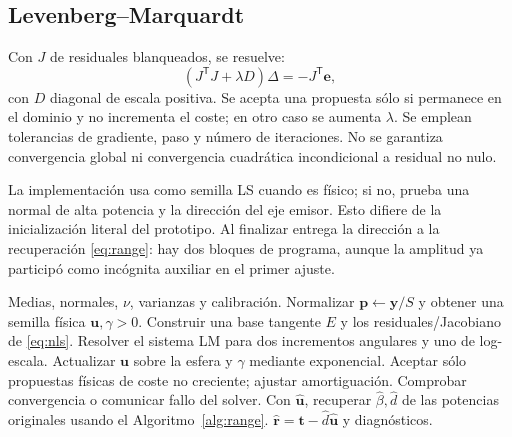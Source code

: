 \documentclass[11pt,a4paper]{article}
\begin{document}
\subsection{Levenberg--Marquardt}
Con $J$ de residuales blanqueados, se resuelve:
\begin{equation}
 (J^{\mathsf T}J+\lambda D)\Delta=-J^{\mathsf T}\mathbf e,
\end{equation}
con $D$ diagonal de escala positiva. Se acepta una propuesta sólo si permanece en el dominio y no incrementa el coste; en otro caso se aumenta $\lambda$. Se emplean tolerancias de gradiente, paso y número de iteraciones. No se garantiza convergencia global ni convergencia cuadrática incondicional a residual no nulo.

La implementación usa como semilla LS cuando es físico; si no, prueba una normal de alta potencia y la dirección del eje emisor. Esto difiere de la inicialización literal del prototipo. Al finalizar entrega la dirección a la recuperación \eqref{eq:range}: hay dos bloques de programa, aunque la amplitud ya participó como incógnita auxiliar en el primer ajuste.

\begin{algorithm}[htbp]\caption{NLS-TCOM adaptado y recuperación posterior}\begin{algorithmic}[1]
\Require Medias, normales, $\nu$, varianzas y calibración.
\State Normalizar $\mathbf p\gets\mathbf y/S$ y obtener una semilla física $\mathbf u,\gamma>0$.
\State Construir una base tangente $E$ y los residuales/Jacobiano de \eqref{eq:nls}.
\State Resolver el sistema LM para dos incrementos angulares y uno de log-escala.
\State Actualizar $\mathbf u$ sobre la esfera y $\gamma$ mediante exponencial.
\State Aceptar sólo propuestas físicas de coste no creciente; ajustar amortiguación.
\State Comprobar convergencia o comunicar fallo del solver.
\EndFor
\State Con $\hat{\mathbf u}$, recuperar $\hat\beta,\hat d$ de las potencias originales usando el Algoritmo~\ref{alg:range}.
\State \Return $\hat{\mathbf r}=\mathbf t-\hat d\hat{\mathbf u}$ y diagnósticos.
\end{algorithmic}\end{algorithm}
\end{document}
